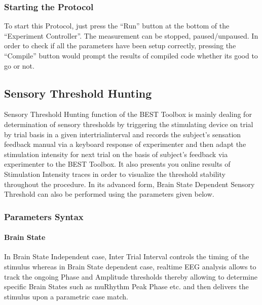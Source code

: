 \documentclass[letterpaper,10pt,english]{sphinxmanual}
\begin{document}
\subsubsection{Starting the Protocol}
\label{\detokenize{14_ERPMeasurement:starting-the-protocol}}
\sphinxAtStartPar
To start this Protocol, just press the “Run” button at the bottom of the “Experiment Controller”. The measurement can be stopped, paused/unpaused. In order to check if all the parameters have been setup correctly, pressing the “Compile” button would prompt the results of compiled code whether its good to go or not.


\subsection{Sensory Threshold Hunting}
\label{\detokenize{15_SensoryThresholdHunting:sensory-threshold-hunting}}\label{\detokenize{15_SensoryThresholdHunting::doc}}
\sphinxAtStartPar
Sensory Threshold Hunting function of the BEST Toolbox is mainly dealing for determination of sensory thresholds by triggering the stimulating device on trial by trial basis in a given inter\sphinxhyphen{}trial\sphinxhyphen{}interval and records the subject’s sensation feedback manual via a keyboard response of experimenter and then adapt the stimulation intensity for next trial on the basis of subject’s feedback via experimenter to the BEST Toolbox. It also presents you online results of Stimulation Intensity traces in order to visualize the threshold stability throughout the procedure. In its advanced form, Brain State\sphinxhyphen{} Dependent Sensory Threshold can also be performed using the parameters given below.


\subsubsection{Parameters Syntax}
\label{\detokenize{15_SensoryThresholdHunting:parameters-syntax}}

\paragraph{Brain State}
\label{\detokenize{15_SensoryThresholdHunting:brain-state}}
\sphinxAtStartPar
In Brain State Independent case, Inter Trial Interval controls the timing of the stimulus whereas in Brain State dependent case, real\sphinxhyphen{}time EEG analysis allows to track the ongoing Phase and Amplitude thresholds thereby allowing to determine specific Brain States such as mu\sphinxhyphen{}Rhythm Peak Phase etc. and then delivers the stimulus upon a parametric case match.
\end{document}
